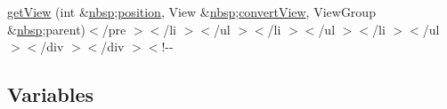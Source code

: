 \begin{DoxyCompactItemize}
\item 
\hyperlink{_show_all_list_adapter_8html_a2d33d78ba824c4c24d519825415a6308}{get\-View} (int \&\hyperlink{_tools_8html_aef915316f784c9063d942974538301a6}{nbsp};\hyperlink{_stations_list_adapter_8html_a7130b1618285588513fd1ff97884b9d9}{position}, View \&\hyperlink{_tools_8html_aef915316f784c9063d942974538301a6}{nbsp};\hyperlink{_stations_list_adapter_8html_a074c9ae2abe97703c9c031be7f3eb2e5}{convert\-View}, View\-Group \&\hyperlink{_tools_8html_aef915316f784c9063d942974538301a6}{nbsp};parent)$<$/pre $>$$<$/li $>$$<$/ul $>$$<$/li $>$$<$/ul $>$$<$/li $>$$<$/ul $>$$<$/div $>$$<$/div $>$$<$!-\/-\/
\end{DoxyCompactItemize}
\subsection*{Variables}
